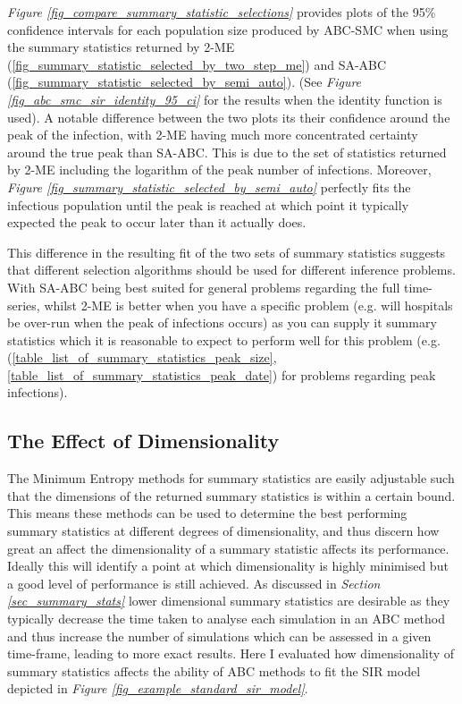 \documentclass[11pt,a4paper]{article}
\theoremstyle{break}
\begin{document}
  \textit{Figure \ref{fig_compare_summary_statistic_selections}} provides plots of the 95\% confidence intervals for each population size produced by ABC-SMC when using the summary statistics returned by 2-ME (\ref{fig_summary_statistic_selected_by_two_step_me}) and SA-ABC (\ref{fig_summary_statistic_selected_by_semi_auto}). (See \textit{Figure \ref{fig_abc_smc_sir_identity_95_ci}} for the results when the identity function is used). A notable difference between the two plots its their confidence around the peak of the infection, with 2-ME having much more concentrated certainty around the true peak than SA-ABC. This is due to the set of statistics returned by 2-ME including the logarithm of the peak number of infections. Moreover, \textit{Figure \ref{fig_summary_statistic_selected_by_semi_auto}} perfectly fits the infectious population until the peak is reached at which point it typically expected the peak to occur later than it actually does.

  \par This difference in the resulting fit of the two sets of summary statistics suggests that different selection algorithms should be used for different inference problems. With SA-ABC being best suited for general problems regarding the full time-series, whilst 2-ME is better when you have a specific problem (e.g. will hospitals be over-run when the peak of infections occurs) as you can supply it summary statistics which it is reasonable to expect to perform well for this problem (e.g. (\ref{table_list_of_summary_statistics_peak_size},\ref{table_list_of_summary_statistics_peak_date}) for problems regarding peak infections).

\subsection{The Effect of Dimensionality}\label{sec_effect_of_dimensionality}

  \par The Minimum Entropy methods for summary statistics are easily adjustable such that the dimensions of the returned summary statistics is within a certain bound. This means these methods can be used to determine the best performing summary statistics at different degrees of dimensionality, and thus discern how great an affect the dimensionality of a summary statistic affects its performance. Ideally this will identify a point at which dimensionality is highly minimised but a good level of performance is still achieved. As discussed in \textit{Section \ref{sec_summary_stats}} lower dimensional summary statistics are desirable as they typically decrease the time taken to analyse each simulation in an ABC method and thus increase the number of simulations which can be assessed in a given time-frame, leading to more exact results. Here I evaluated how dimensionality of summary statistics affects the ability of ABC methods to fit the SIR model depicted in \textit{Figure \ref{fig_example_standard_sir_model}}.
\end{document}
